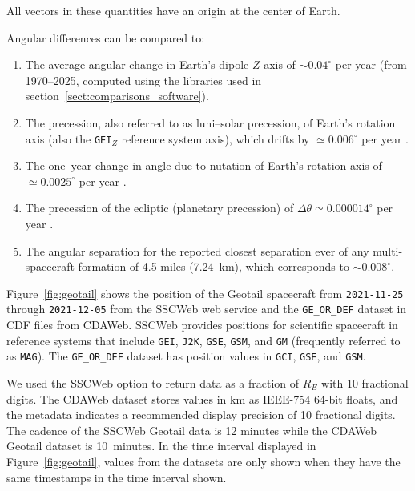 \documentclass[draft]{agujournal2019}
\begin{document}
All vectors in these quantities have an origin at the center of Earth. 

\noindent Angular differences can be compared to:
\begin{enumerate}
    \item The average angular change in Earth's dipole $Z$ axis of ${\sim} 0.04^\circ$ per year (from 1970--2025, computed using the libraries used in section~\ref{sect:comparisons_software}).

    \item The precession, also referred to as luni--solar precession, of Earth's rotation axis (also the \texttt{GEI}$_Z$ reference system axis), which drifts by $\simeq 0.006^\circ$ per year \cite{Hapgood1995}.

    \item The one--year change in angle due to nutation of Earth's rotation axis of $\simeq 0.0025^\circ$ per year \cite{Hapgood1995}.
    
    \item The precession of the ecliptic (planetary precession) of $\Delta \theta \simeq 0.000014^\circ$ per year \cite{Hapgood1995}.

    \item The angular separation for the reported closest separation ever of any multi-spacecraft formation \cite{NASA2016} of 4.5 miles (7.24~km), which corresponds to ${\sim}0.008^\circ$.
\end{enumerate}

Figure~\ref{fig:geotail} shows the position of the Geotail spacecraft from \texttt{2021-11-25} through \texttt{2021-12-05} from the SSCWeb web service and the \texttt{GE\_OR\_DEF} dataset in CDF \cite{CDF2025} files from CDAWeb. SSCWeb provides positions for scientific spacecraft in reference systems that include \texttt{GEI}, \texttt{J2K}, \texttt{GSE}, \texttt{GSM}, and \texttt{GM} (frequently referred to as \texttt{MAG}). The \texttt{GE\_OR\_DEF} dataset has position values in \texttt{GCI}, \texttt{GSE}, and \texttt{GSM}.

We used the SSCWeb option to return data as a fraction of $R_E$ with 10 fractional digits. The CDAWeb dataset stores values in km as IEEE-754 64-bit floats, and the metadata indicates a recommended display precision of 10 fractional digits. The cadence of the SSCWeb Geotail data is 12 minutes while the CDAWeb Geotail dataset is 10~minutes. In the time interval displayed in Figure~\ref{fig:geotail}, values from the datasets are only shown when they have the same timestamps in the time interval shown.
\end{document}
